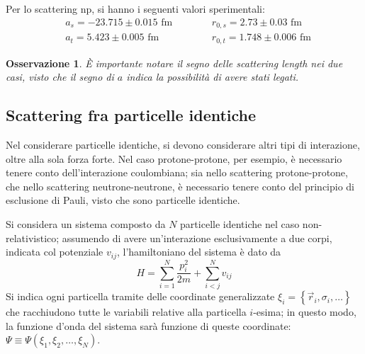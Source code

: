\documentclass[11pt, a4paper]{scrartcl}
\theoremstyle{style}
\newtheorem{osservazione}{Osservazione}[section]
\numberwithin{equation}{subsection}
\begin{document}
\noindent Per lo scattering np, si hanno i seguenti valori sperimentali:
\begin{align}
		&a _s = - 23.715 \pm 0.015 \text{ fm} &\hspace{1cm} &r_{0,s} = 2.73 \pm 0.03 \text{ fm} \tag*{}\\
		&a_t = 5.423 \pm 0.005 \text{ fm} &\hspace{1cm} &r_{0,t} = 1.748 \pm 0.006 \text{ fm} \tag*{}
\end{align}
\begin{osservazione}
\`E importante notare il segno delle scattering length nei due casi, visto che il segno di $a$ indica la possibilit\`a di avere stati legati.
\end{osservazione}

\subsection{Scattering fra particelle identiche}

Nel considerare particelle identiche, si devono considerare altri tipi di interazione, oltre alla sola forza forte.
Nel caso protone-protone, per esempio, \`e necessario tenere conto dell'interazione coulombiana; sia nello scattering protone-protone, che nello scattering neutrone-neutrone, \`e necessario tenere conto del principio di esclusione di Pauli, visto che sono particelle identiche.

Si considera un sistema composto da $N$ particelle identiche nel caso non-relativistico; assumendo di avere un'interazione esclusivamente a due corpi, indicata col potenziale $v_{ij}$, l'hamiltoniano del sistema \`e dato da 
\[
H = \sum_{i=1}^{N}  \frac{p_i^2}{2m} + \sum_{i<j}^{N}  v_{ij}
\] 
Si indica ogni particella tramite delle coordinate generalizzate $\xi _i = \left\{ \vec{r}_i , \sigma _i ,\ldots \right\} $ che racchiudono tutte le variabili relative alla particella $i$-esima; in questo modo, la funzione d'onda del sistema sar\`a funzione di queste coordinate: $\Psi \equiv \Psi (\xi _1,\xi _2,\ldots,\xi _N)$.
\end{document}
